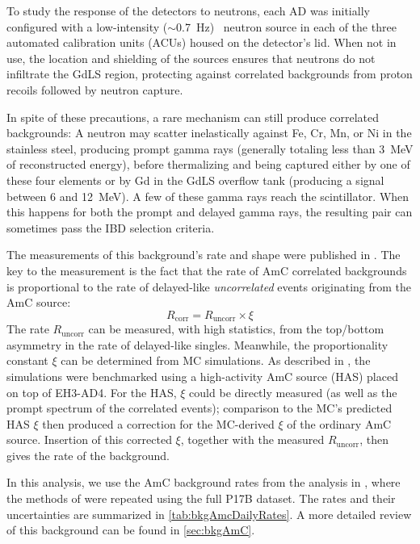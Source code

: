 \documentclass[../thesis.tex]{subfiles}
\begin{document}
To study the response of the detectors to neutrons, each AD was initially configured with a low-intensity ($\sim$0.7~Hz) \AmC\ neutron source in each of the three automated calibration units (ACUs) housed on the detector's lid. When not in use, the location and shielding of the sources ensures that neutrons do not infiltrate the GdLS region, protecting against correlated backgrounds from proton recoils followed by neutron capture.

In spite of these precautions, a rare mechanism can still produce correlated backgrounds: A neutron may scatter inelastically against Fe, Cr, Mn, or Ni in the stainless steel, producing prompt gamma rays (generally totaling less than 3~MeV of reconstructed energy), before thermalizing and being captured either by one of these four elements or by Gd in the GdLS overflow tank (producing a signal between 6 and 12~MeV). A few of these gamma rays reach the scintillator. When this happens for both the prompt and delayed gamma rays, the resulting pair can sometimes pass the IBD selection criteria.

The measurements of this background's rate and shape were published in \cite{Gu_2016}. The key to the measurement is the fact that the rate of AmC correlated backgrounds is proportional to the rate of delayed-like \emph{uncorrelated} events originating from the AmC source:
\begin{equation}
  R_{\mathrm{corr}} = R_{\mathrm{uncorr}} \times \xi
  \label{eq:bkgAmcFundamentalOverview}
\end{equation}
The rate $R_{\mathrm{uncorr}}$ can be measured, with high statistics, from the top/bottom asymmetry in the rate of delayed-like singles. Meanwhile, the proportionality constant $\xi$ can be determined from MC simulations. As described in \cite{Gu_2016}, the simulations were benchmarked using a high-activity AmC source (HAS) placed on top of EH3-AD4. For the HAS, $\xi$ could be directly measured (as well as the prompt spectrum of the correlated events); comparison to the MC's predicted HAS $\xi$ then produced a correction for the MC-derived $\xi$ of the ordinary AmC source. Insertion of this corrected $\xi$, together with the measured $R_{\mathrm{uncorr}}$, then gives the rate of the background.

In this analysis, we use the AmC background rates from the analysis in \cite{lianghongBkg}, where the methods of \cite{Gu_2016} were repeated using the full P17B dataset. The rates and their uncertainties are summarized in \autoref{tab:bkgAmcDailyRates}. A more detailed review of this background can be found in \autoref{sec:bkgAmC}.
\end{document}
